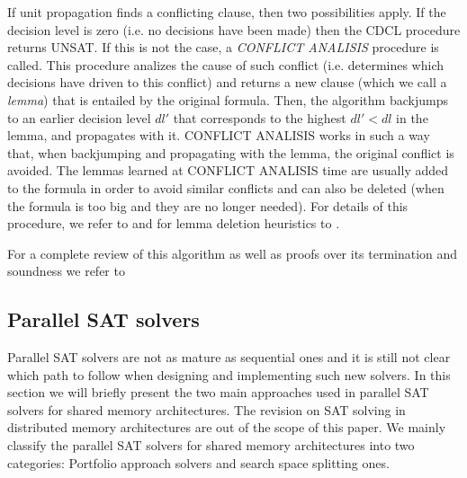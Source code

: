 If unit propagation finds a conflicting clause, then two possibilities
apply. If the decision level is zero
(i.e. no decisions have been made) then the CDCL procedure returns
UNSAT. If this is not the case, a \emph{CONFLICT ANALISIS} procedure
is called. This procedure analizes the cause of such conflict
(i.e. determines which decisions have driven to this conflict) and
returns a new clause (which we call a \emph{lemma}) that is entailed
by the original formula. Then, the algorithm backjumps to an earlier
decision level $dl'$ that corresponds to the highest $dl'<dl$ in the
lemma, and propagates with it.  CONFLICT ANALISIS works in such a way
that, when backjumping and propagating with the lemma, the original
conflict is avoided. The lemmas learned at CONFLICT ANALISIS time are
usually added to the formula in order to avoid similar conflicts and
can also be deleted (when the formula is too big and they are no
longer needed). For details of this procedure, we refer to
\cite{GRASP1999IEEE,Zhang2001} and for lemma deletion heuristics to
\cite{Relsat97,Goldberg2002DATE,gluclose}.

For a complete review of this algorithm as well as proofs over its
termination and soundness we refer to \cite{Nieuwenhuisetal2006JACM}


\subsection{Parallel SAT solvers}

Parallel SAT solvers are not as mature as sequential ones and it is
still not clear which path to follow when designing and implementing
such new solvers. In this section we will briefly present the two main approaches
used in parallel SAT solvers for shared memory architectures. The revision on 
SAT solving in distributed memory architectures are out of the scope of this paper.
We mainly classify the parallel SAT solvers for shared memory architectures into two
categories: Portfolio approach solvers and search space splitting ones.


